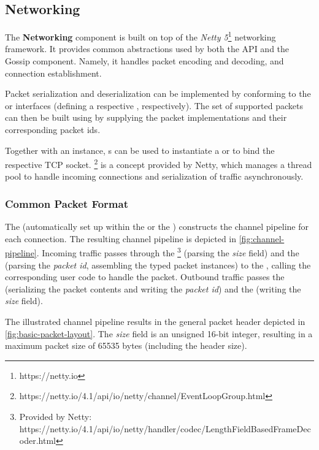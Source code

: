 \subsection{Networking}\label{subsec:networking}

The \textbf{Networking} component is built on top of the \textit{Netty 5}\footnote{https://netty.io} networking framework.
It provides common abstractions used by both the API and the Gossip component.
Namely, it handles packet encoding and decoding, and connection establishment.

Packet serialization and deserialization can be implemented by conforming to the  or
 interfaces (defining a respective , respectively).
The set of supported packets can then be built using  by supplying the packet
implementations and their corresponding packet ids.

Together with an  instance, s can be used to instantiate
a  or  to bind the respective TCP socket.
\footnote{https://netty.io/4.1/api/io/netty/channel/EventLoopGroup.html}
is a concept provided by Netty, which manages a thread pool to handle incoming connections and
serialization of traffic asynchronously.

\subsubsection{Common Packet Format}

The  (automatically set up within the  or the )
constructs the channel pipeline for each connection.
The resulting channel pipeline is depicted in \autoref{fig:channel-pipeline}.
Incoming traffic passes through the \footnote{Provided by Netty: https://netty.io/4.1/api/io/netty/handler/codec/LengthFieldBasedFrameDecoder.html}
(parsing the \textit{size} field) and the  (parsing the \textit{packet id}, assembling the typed packet instances)
to the , calling the corresponding user code to handle the packet.
Outbound traffic passes the  (serializing the packet contents and writing the \textit{packet id})
and the  (writing the \textit{size} field).

The illustrated channel pipeline results in the general packet header depicted in \autoref{fig:basic-packet-layout}.
The \textit{size} field is an unsigned 16-bit integer, resulting in a maximum packet size of
65535 bytes (including the header size).

